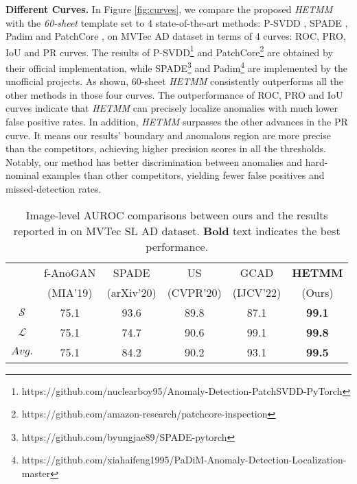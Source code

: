 \documentclass[default,iicol]{sn-jnl}\usepackage[algo2e,ruled,linesnumbered]{algorithm2e}
\theoremstyle{thmstyleone}\newtheorem{theorem}{Theorem}\newtheorem{proposition}[theorem]{Proposition}
\theoremstyle{thmstyletwo}\newtheorem{example}{Example}\newtheorem{remark}{Remark}
\theoremstyle{thmstylethree}\newtheorem{definition}{Definition}
\begin{document}
\noindent\textbf{Different Curves. }
In Figure \ref{fig:curves}, we compare the proposed \textit{HETMM} with the \textit{60-sheet} template set to 4 state-of-the-art methods: P-SVDD \cite{psvdd}, SPADE \cite{SPADE}, Padim \cite{Padim} and PatchCore \cite{patchcore}, on MVTec AD dataset in terms of 4 curves: ROC, PRO, IoU and PR curves.
The results of P-SVDD\footnote{https://github.com/nuclearboy95/Anomaly-Detection-PatchSVDD-PyTorch} and PatchCore\footnote{https://github.com/amazon-research/patchcore-inspection} are obtained by their official implementation, while SPADE\footnote{https://github.com/byungjae89/SPADE-pytorch} and Padim\footnote{https://github.com/xiahaifeng1995/PaDiM-Anomaly-Detection-Localization-master} are implemented by the unofficial projects.
As shown, 60-sheet \textit{HETMM} consistently outperforms all the other methods in those four curves.
The outperformance of ROC, PRO and IoU curves indicate that \textit{HETMM} can precisely localize anomalies with much lower false positive rates.
In addition, \textit{HETMM} surpasses the other advances in the PR curve.
It means our results' boundary and anomalous region are more precise than the competitors, achieving higher precision scores in all the thresholds.
Notably, our method has better discrimination between anomalies and hard-nominal examples than other competitors, yielding fewer false positives and missed-detection rates.


\begin{table}[!t]
    \caption{
    Image-level AUROC comparisons between ours and the results reported in \cite{MVTECLOCO} on MVTec SL AD dataset.
    \textbf{Bold} text indicates the best performance.
    }
    \tiny
    \centering
    \setlength{\tabcolsep}{0.7mm}
    \begin{tabular}{c|ccccc}
        \hline
        \multirow{2}{*}{} &f-AnoGAN\cite{F-AnoGan} &SPADE\cite{SPADE}  &US\cite{US}   &GCAD\cite{MVTECLOCO}  &\textbf{HETMM} \\
                          &(MIA'19)              &(arXiv'20)         &(CVPR'20)     &(IJCV'22) &(Ours)        \\\hline
        $\mathcal{S}$     &75.1                 &93.6              &89.8         &87.1            &\textbf{99.1} \\
        $\mathcal{L}$     &75.1                 &74.7              &90.6         &99.1            &\textbf{99.8} \\\hline
        $Avg.$            &75.1                 &84.2              &90.2         &93.1            &\textbf{99.5} \\\hline
    \end{tabular}
    \label{table:MVTECSL}
\end{table}
\end{document}
